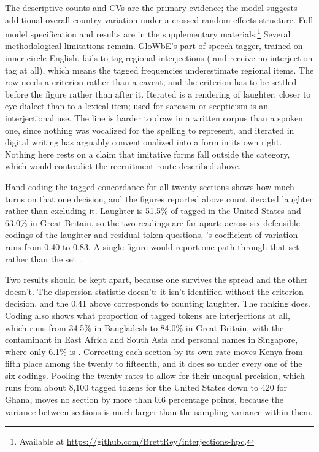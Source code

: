 \documentclass[12pt]{article}
\newif\ifblind
\begin{document}
The descriptive counts and CVs are the primary evidence; the model suggests
additional overall country variation under a crossed random-effects
structure. Full model
specification and results are in the
supplementary materials.\footnote{\ifblind Available at
  [link removed for blind review].\else Available at
  \url{https://github.com/BrettRey/interjections-hpc}.\fi}
Several methodological limitations remain. GloWbE's
part-of-speech tagger, trained on inner-circle English, fails to tag
regional interjections ( and  receive no
interjection tag at all), which means the tagged frequencies
underestimate regional items. The  row needs a criterion
rather than a caveat, and the criterion has to be settled before the figure
rather than after it. Iterated  is a rendering of laughter,
closer to eye dialect than to a lexical item;  used for sarcasm or
scepticism is an interjectional use. The line is harder to draw in a written
corpus than a spoken one, since nothing was vocalized for the spelling to
represent, and iterated  in digital writing has arguably
conventionalized into a form in its own right. Nothing here rests on a claim
that imitative forms fall outside the category, which would contradict the
recruitment route described above.

Hand-coding the tagged concordance for all twenty sections shows how much
turns on that one decision, and the figures reported above count iterated
laughter rather than excluding it. Laughter is 51.5\% of tagged 
in the United States and 63.0\% in Great Britain, so the two readings are far
apart: across six defensible codings of the laughter and residual-token
questions, 's coefficient of variation runs from 0.40 to 0.83.
A single figure would report one path through that set rather than the set
\citep[cf.][]{gelman2014statcrisis}.

Two results should be kept apart, because one survives the spread and the
other doesn't. The dispersion statistic doesn't: it isn't identified without
the criterion decision, and the 0.41 above corresponds to counting laughter.
The ranking does. Coding also shows what proportion of tagged tokens are
interjections at all, which runs from 34.5\% in Bangladesh to 84.0\% in Great
Britain, with  the contaminant in East Africa and South Asia and
personal names in Singapore, where only 6.1\% is . Correcting
each section by its own rate moves Kenya from fifth place among the twenty to
fifteenth, and it does so under every one of the six codings. Pooling the
twenty rates to allow for their unequal precision, which runs from about 8,100
tagged tokens for the United States down to 420 for Ghana, moves no section by
more than 0.6 percentage points, because the variance between sections is much
larger than the sampling variance within them.
\end{document}
